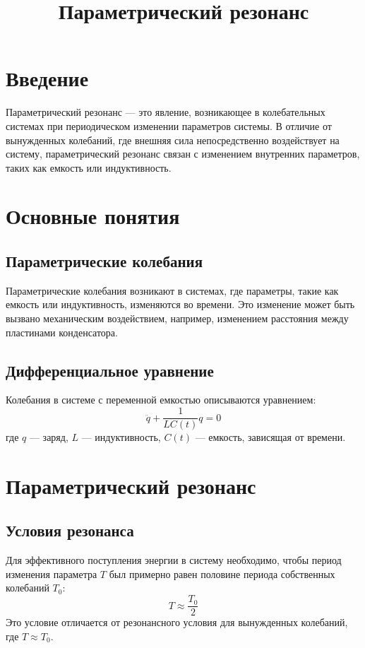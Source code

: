 \documentclass[10pt]{article}
\begin{document}
\title{Параметрический резонанс}
\author{}
\date{}
\maketitle

\section*{Введение}
Параметрический резонанс — это явление, возникающее в колебательных системах при периодическом изменении параметров системы. В отличие от вынужденных колебаний, где внешняя сила непосредственно воздействует на систему, параметрический резонанс связан с изменением внутренних параметров, таких как емкость или индуктивность.

\section*{Основные понятия}
\subsection*{Параметрические колебания}
Параметрические колебания возникают в системах, где параметры, такие как емкость или индуктивность, изменяются во времени. Это изменение может быть вызвано механическим воздействием, например, изменением расстояния между пластинами конденсатора.

\subsection*{Дифференциальное уравнение}
Колебания в системе с переменной емкостью описываются уравнением:
\begin{equation*}
\ddot{q}+\frac{1}{L C(t)} q=0
\end{equation*}
где $q$ — заряд, $L$ — индуктивность, $C(t)$ — емкость, зависящая от времени.

\section*{Параметрический резонанс}
\subsection*{Условия резонанса}
Для эффективного поступления энергии в систему необходимо, чтобы период изменения параметра $T$ был примерно равен половине периода собственных колебаний $T_0$:
\begin{equation*}
T \approx \frac{T_{0}}{2}
\end{equation*}
Это условие отличается от резонансного условия для вынужденных колебаний, где $T \approx T_{0}$.
\end{document}
